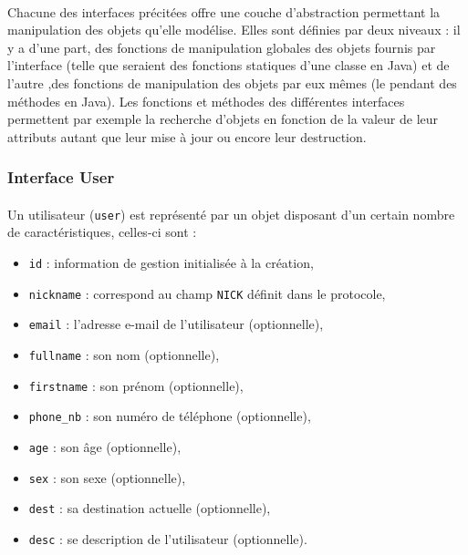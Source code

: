 \paragraph{}

Chacune des interfaces précitées offre une couche d'abstraction permettant la manipulation
des objets qu'elle modélise. Elles sont définies par deux niveaux : il y a d'une part, des
fonctions de manipulation globales des objets fournis par l'interface (telle que seraient
des fonctions statiques d'une classe en Java) et de l'autre ,des fonctions de manipulation
des objets par eux mêmes (le pendant des méthodes en Java). Les fonctions et méthodes des
différentes interfaces permettent par exemple la recherche d'objets en fonction de la valeur
de leur attributs autant que leur mise à jour ou encore leur destruction.


\subsubsection{Interface User}

\paragraph{}

Un utilisateur (\texttt{user}) est représenté par un objet disposant
d'un certain nombre de caractéristiques, celles-ci sont :

\begin{itemize}
	\item \texttt{id} : information de gestion initialisée à la création,
	\item \texttt{nickname}	: correspond au champ \texttt{NICK} définit dans le protocole,
	\item \texttt{email} : l'adresse e-mail de l'utilisateur (optionnelle),
	\item \texttt{fullname} : son nom (optionnelle),
	\item \texttt{firstname} : son prénom (optionnelle),
	\item \texttt{phone\_nb} : son numéro de téléphone (optionnelle),
	\item \texttt{age} : son âge (optionnelle),
	\item \texttt{sex} : son sexe (optionnelle),
	\item \texttt{dest} : sa destination actuelle (optionnelle),
	\item \texttt{desc} : se description de l'utilisateur (optionnelle).
\end{itemize}


